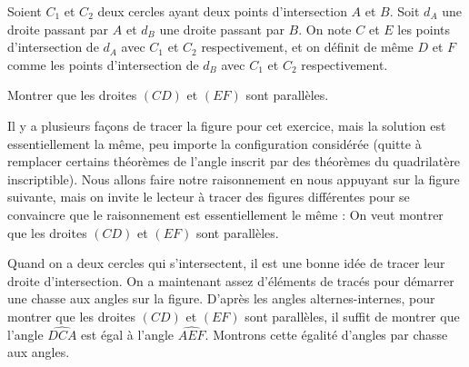 \begin{exo}
Soient $C_{1}$ et $C_{2}$ deux cercles ayant deux points d'intersection $A$ et $B$. Soit $d_{A}$ une droite passant par $A$ et $d_{B}$ une droite passant par $B$. On note $C$ et $E$ les points d'intersection de $d_{A}$ avec $C_{1}$ et $C_{2}$ respectivement, et on définit de même $D$ et $F$ comme les points d'intersection de $d_{B}$ avec $C_{1}$ et $C_{2}$ respectivement.

Montrer que les droites $(CD)$ et $(EF)$ sont parallèles.
\end{exo}

\begin{sol}
Il y a plusieurs façons de tracer la figure pour cet exercice, mais la solution est essentiellement la même, peu importe la configuration considérée (quitte à remplacer certains théorèmes de l'angle inscrit par des théorèmes du quadrilatère inscriptible). Nous allons faire notre raisonnement en nous appuyant sur la figure suivante, mais on invite le lecteur à tracer des figures différentes pour se convaincre que le raisonnement est essentiellement le même :
\newline
On veut montrer que les droites $(CD)$ et $(EF)$ sont parallèles.

Quand on a deux cercles qui s'intersectent, il est une bonne idée de tracer leur droite d'intersection. On a maintenant assez d'éléments de tracés pour démarrer une chasse aux angles sur la figure.
\newline
D'après les angles alternes-internes, pour montrer que les droites $(CD)$ et $(EF)$ sont parallèles, il suffit de montrer que l'angle $\widehat{DCA}$ est égal à l'angle $\widehat{AEF}$. Montrons cette égalité d'angles par chasse aux angles.


\end{sol}
